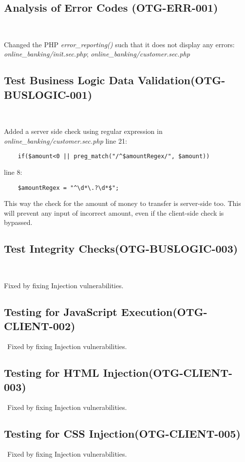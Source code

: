 \documentclass[headsepline,footsepline,footinclude=false,oneside,fontsize=11pt,paper=a4,listof=totoc,bibliography=totoc]{scrbook} %
\begin{document}
 
\subsection{Analysis of Error Codes (OTG-ERR-001)}\

Changed the PHP \textit{error\_reporting()} such that it does not display any errors: \textit{online\_banking/init.sec.php}; \textit{online\_banking/customer.sec.php}\\

\pagebreak
\subsection{Test Business Logic Data Validation(OTG-BUSLOGIC-001)}\

Added a server side check using regular expression in \textit{online\_banking/customer.sec.php} line 21: 
	\begin{lstlisting} 
	if($amount<0 || preg_match("/^$amountRegex/", $amount)) 
	\end{lstlisting}
	
	line 8:  
	
	\begin{lstlisting} 
	$amountRegex = "^\d*\.?\d*$";
	\end{lstlisting}
	
This way the check for the amount of money to transfer is server-side too. This will prevent any input of incorrect amount, even if the client-side check is bypassed.\\

 
\subsection{Test Integrity Checks(OTG-BUSLOGIC-003)}\

Fixed by fixing Injection vulnerabilities.\\
 
 
\subsection{Testing for JavaScript Execution(OTG-CLIENT-002)}\
Fixed by fixing Injection vulnerabilities. \\

 
\subsection{Testing for HTML Injection(OTG-CLIENT-003)}\
Fixed by fixing Injection vulnerabilities.\\ 

\subsection{Testing for CSS Injection(OTG-CLIENT-005)}\
Fixed by fixing Injection vulnerabilities.
\end{document}
